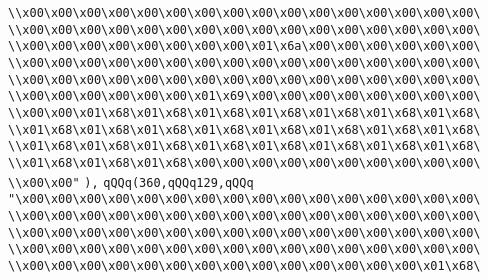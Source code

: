 \verb|\\x00\x00\x00\x00\x00\x00\x00\x00\x00\x00\x00\x00\x00\x00\x00\x00\|\newline
\verb|\\x00\x00\x00\x00\x00\x00\x00\x00\x00\x00\x00\x00\x00\x00\x00\x00\|\newline
\verb|\\x00\x00\x00\x00\x00\x00\x00\x00\x01\x6a\x00\x00\x00\x00\x00\x00\|\newline
\verb|\\x00\x00\x00\x00\x00\x00\x00\x00\x00\x00\x00\x00\x00\x00\x00\x00\|\newline
\verb|\\x00\x00\x00\x00\x00\x00\x00\x00\x00\x00\x00\x00\x00\x00\x00\x00\|\newline
\verb|\\x00\x00\x00\x00\x00\x00\x01\x69\x00\x00\x00\x00\x00\x00\x00\x00\|\newline
\verb|\\x00\x00\x01\x68\x01\x68\x01\x68\x01\x68\x01\x68\x01\x68\x01\x68\|\newline
\verb|\\x01\x68\x01\x68\x01\x68\x01\x68\x01\x68\x01\x68\x01\x68\x01\x68\|\newline
\verb|\\x01\x68\x01\x68\x01\x68\x01\x68\x01\x68\x01\x68\x01\x68\x01\x68\|\newline
\verb|\\x01\x68\x01\x68\x01\x68\x00\x00\x00\x00\x00\x00\x00\x00\x00\x00\|\newline
\verb|\\x00\x00"|\newline
\verb|),|\newline
\verb|qQQq(360,qQQq129,qQQq|\newline
\verb|"\x00\x00\x00\x00\x00\x00\x00\x00\x00\x00\x00\x00\x00\x00\x00\x00\|\newline
\verb|\\x00\x00\x00\x00\x00\x00\x00\x00\x00\x00\x00\x00\x00\x00\x00\x00\|\newline
\verb|\\x00\x00\x00\x00\x00\x00\x00\x00\x00\x00\x00\x00\x00\x00\x00\x00\|\newline
\verb|\\x00\x00\x00\x00\x00\x00\x00\x00\x00\x00\x00\x00\x00\x00\x00\x00\|\newline
\verb|\\x00\x00\x00\x00\x00\x00\x00\x00\x00\x00\x00\x00\x00\x00\x01\x68\|\newline

